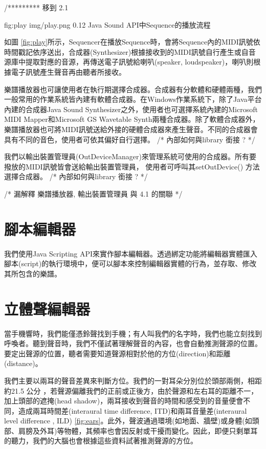 \documentclass[12pt,a4paper,oneside]{report}
\begin{document}
/*********  移到 2.1 

\figurewithcaption
{fig:play}
{img/play.png}
{0.12}
{Java Sound API中Sequence的播放流程}

如圖 \ref{fig:play}所示，Sequencer在播放Sequence時，會將Sequence內的MIDI訊號依時間戳記依序送出，合成器(Synthesizer)根據接收到的MIDI訊號自行產生或自音源庫中提取對應的音源，再傳送電子訊號給喇叭(speaker, loudspeaker)，喇叭則根據電子訊號產生聲音再由聽者所接收。



樂譜播放器也可讓使用者在執行期選擇合成器。合成器有分軟體和硬體兩種，我們一般常用的作業系統皆內建有軟體合成器。在Windows作業系統下，除了Java平台內建的合成器Java Sound Synthesizer之外，使用者也可選擇系統內建的Microsoft MIDI Mapper和Microsoft GS Wavetable Synth兩種合成器。除了軟體合成器外，樂譜播放器也可將MIDI訊號送給外接的硬體合成器來產生聲音。不同的合成器會具有不同的音色，使用者可依其偏好自行選擇。 /* 內部如何與library 銜接 ?  */

我們以輸出裝置管理員(OutDeviceManager)來管理系統可使用的合成器。所有要撥放的MIDI訊號皆會送給輸出裝置管理員， 使用者可呼叫其setOutDevice() 方法選擇合成器。 /* 內部如何與library 銜接 ?  */

/*  漏解釋 樂譜播放器, 輸出裝置管理員 與 4.1 的關聯  */




\section{腳本編輯器} %
\label{sec:scriptEditor}

我們使用Java Scripting API來實作腳本編輯器。透過綁定功能將編輯器實體匯入腳本(script)的執行環境中，便可以腳本來控制編輯器實體的行為，並存取、修改其所包含的樂譜。

\section{立體聲編輯器} %

當手機響時，我們能僅憑鈴聲找到手機；有人叫我們的名字時，我們也能立刻找到呼喚者。聽到聲音時，我們不僅試著理解聲音的內容，也會自動推測聲源的位置。要定出聲源的位置，聽者需要知道聲源相對於他的方位(direction)和距離(distance)。

我們主要以兩耳的聲音差異來判斷方位。我們的一對耳朵分別位於頭部兩側，相距約21.5 公分 \cite{wikiSoundLocalization}，若聲源偏離我們的正前或正後方，由於聲源和左右耳的距離不一，加上頭部的遮掩(head shadow)，兩耳接收到聲音的時間和感受到的音量便會不同，造成兩耳時間差(interaural time difference, ITD)和兩耳音量差(interaural level difference , ILD) \ref{fig:ears}。此外，聲波通過環境(如地面、牆壁)或身體(如頭部、肩膀及外耳)等物體，其頻率也會因反射或干擾而變化。因此，即便只剩單耳的聽力，我們的大腦也會根據這些資料試著推測聲源的方位。
\end{document}
